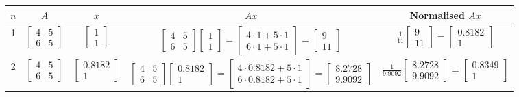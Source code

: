 \documentclass[12pt]{article}
\begin{document}
\begin{adjustwidth}{-1.7cm}{}
    \begin{tabular}{|c|c|c|c|c|}
        \hline
        $n$ & $A$ & $x$ & $Ax$ & Normalised $Ax$ \\ \hline
        
        1 & $\begin{bmatrix} 4 & 5 \\ 6 & 5 \end{bmatrix}$ & $\begin{bmatrix} 1 \\ 1 \end{bmatrix}$ & 
        $\begin{bmatrix} 4 & 5 \\ 6 & 5 \end{bmatrix} \begin{bmatrix} 1 \\ 1 \end{bmatrix} = \begin{bmatrix} 4 \cdot 1 + 5 \cdot 1 \\ 6 \cdot 1 + 5 \cdot 1 \end{bmatrix} = \begin{bmatrix} 9 \\ 11 \end{bmatrix}$ &
        $\frac{1}{11} \begin{bmatrix} 9 \\ 11 \end{bmatrix} = \begin{bmatrix} 0.8182 \\ 1 \end{bmatrix}$ \\ \hline
        
        2 & $\begin{bmatrix} 4 & 5 \\ 6 & 5 \end{bmatrix}$ & $\begin{bmatrix} 0.8182 \\ 1 \end{bmatrix}$ & 
        $\begin{bmatrix} 4 & 5 \\ 6 & 5 \end{bmatrix} \begin{bmatrix} 0.8182 \\ 1 \end{bmatrix} = \begin{bmatrix} 4 \cdot 0.8182 + 5 \cdot 1 \\ 6 \cdot 0.8182 + 5 \cdot 1 \end{bmatrix} = \begin{bmatrix} 8.2728 \\ 9.9092 \end{bmatrix}$ &
        $\frac{1}{9.9092} \begin{bmatrix} 8.2728 \\ 9.9092 \end{bmatrix} = \begin{bmatrix} 0.8349 \\ 1 \end{bmatrix}$ \\ \hline
        

\end{tabular}
\end{adjustwidth}
\end{document}

